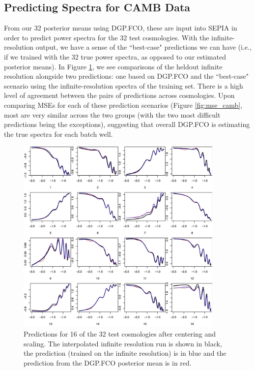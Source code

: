 \documentclass[11pt]{article}
\begin{document}
\subsection{Predicting Spectra for CAMB Data}
\label{subsec:camb_pred}

From our 32 posterior means using DGP.FCO, these are input into SEPIA in order to predict power spectra
for the 32 test cosmologies. With the infinite-resolution output, we have a sense of the ``best-case" 
predictions we can have (i.e., if we trained with the 32 true power spectra, as opposed to our 
estimated posterior means). In Figure \ref{fig:pca_preds_v_camb}, we see comparisons of the heldout 
infinite resolution alongside two predictions: one based on DGP.FCO and the ``best-case" scenario using the
infinite-resolution spectra of the training set. There is a high level of agreement between the pairs
of predictions across cosmologies. Upon comparing MSEs for each of these prediction scenarios 
(Figure \ref{fig:mse_camb}, most are very similar across the two groups (with the two most difficult 
predictions being the exceptions), suggesting that overall DGP.FCO is estimating the true spectra 
for each batch well.

\begin{figure}
    \centering
    \includegraphics[width=4in]{preds_diff1_4_8.jpg}
    \caption{Predictions for 16 of the 32 test cosmologies after centering and scaling. 
             The interpolated infinite resolution run is shown in black, the prediction 
             (trained on the infinite resolution) is in blue and the prediction from 
             the DGP.FCO posterior mean is in red.}   
    \label{fig:pca_preds_v_camb}
\end{figure}
\end{document}
